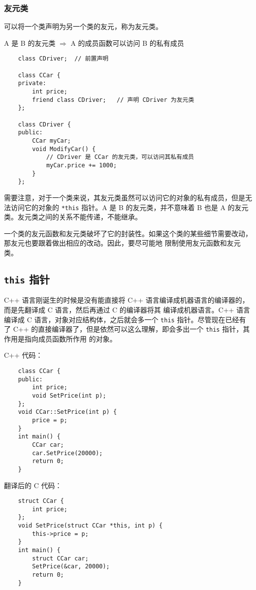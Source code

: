\documentclass[UTF8]{ctexart}
\begin{document}
\subsubsection{友元类}
可以将一个类声明为另一个类的友元，称为友元类。

A 是 B 的友元类 $\Rightarrow$ A 的成员函数可以访问 B 的私有成员

\begin{verbatim}
    class CDriver;  // 前置声明

    class CCar {
    private:
        int price;
        friend class CDriver;   // 声明 CDriver 为友元类
    };

    class CDriver {
    public:
        CCar myCar;
        void ModifyCar() {
            // CDriver 是 CCar 的友元类，可以访问其私有成员
            myCar.price += 1000;
        }
    };
\end{verbatim}

需要注意，对于一个类来说，其友元类虽然可以访问它的对象的私有成员，但是无法访问它的对象的 \texttt{*this}
指针。A 是 B 的友元类，并不意味着 B 也是 A 的友元类。友元类之间的关系不能传递，不能继承。

一个类的友元函数和友元类破坏了它的封装性。如果这个类的某些细节需要改动，那友元也要跟着做出相应的改动。因此，要尽可能地
限制使用友元函数和友元类。

\subsection{\texttt{this} 指针}
C++ 语言刚诞生的时候是没有能直接将 C++ 语言编译成机器语言的编译器的，而是先翻译成 C 语言，然后再通过 C 的编译器将其
编译成机器语言。C++ 语言编译成 C 语言，对象对应结构体，之后就会多一个 \texttt{this} 指针。尽管现在已经有
了 C++ 的直接编译器了，但是依然可以这么理解，即会多出一个 \texttt{this} 指针，其作用是指向成员函数所作用
的对象。

C++ 代码：
\begin{verbatim}
    class CCar {
    public:
        int price;
        void SetPrice(int p);
    };
    void CCar::SetPrice(int p) {
        price = p;
    }
    int main() {
        CCar car;
        car.SetPrice(20000);
        return 0;
    }
\end{verbatim}

翻译后的 C 代码：
\begin{verbatim}
    struct CCar {
        int price;
    };
    void SetPrice(struct CCar *this, int p) {
        this->price = p;
    }
    int main() {
        struct CCar car;
        SetPrice(&car, 20000);
        return 0;
    }
\end{verbatim}
\end{document}

